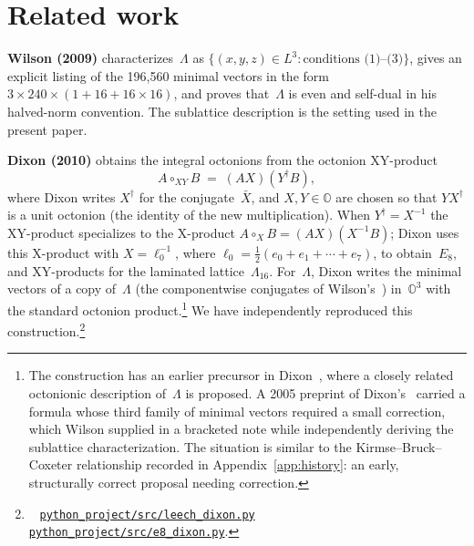 \documentclass[twoside,english]{paper}
\numberwithin{equation}{section}
\numberwithin{figure}{section}
\theoremstyle{definition}
\theoremstyle{remark}
\newcommand{\OO}{\mathbb{O}}          %
\newcommand{\LL}{\Lambda}             %
\newcommand{\scriptref}[1]{\cite{repo}~%
  \href{https://github.com/koeplinger/leech\_alg/blob/main/python\_project/src/#1}%
  {\nolinkurl{python_project/src/#1}}}
\begin{document}
\section{Related work}\label{sec:related}

\textbf{Wilson (2009)} \cite{Wilson2009} characterizes~$\LL$ as
$\{(x,y,z) \in L^3 : \text{conditions (1)--(3)}\}$, gives an explicit
listing of the 196{,}560 minimal vectors in the form
$3 \times 240 \times (1 + 16 + 16 \times 16)$, and proves that~$\LL$
is even and self-dual in his halved-norm convention.  The sublattice description is
the setting used in the present paper.

\textbf{Dixon (2010)} \cite{Dixon2010} obtains the integral octonions
from the octonion XY-product
\begin{equation}\label{eq:disp10}
  A \circ_{XY} B \;=\; (A X)(Y^{\dagger} B),
\end{equation}
where Dixon writes $X^{\dagger}$ for the conjugate~$\bar X$, and
$X, Y \in \OO$ are chosen so that $Y X^{\dagger}$ is a unit octonion
(the identity of the new multiplication).  When $Y^{\dagger} = X^{-1}$
the XY-product specializes to the X-product $A \circ_X B = (AX)(X^{-1}
B)$; Dixon uses this X-product with $X = \ell_0^{-1}$, where $\ell_0 =
\frac{1}{2}(e_0 + e_1 + \cdots + e_7)$, to obtain~$E_8$, and XY-products
for the laminated lattice~$\Lambda_{16}$.  For~$\LL$, Dixon writes the
minimal vectors of a copy of~$\LL$ (the componentwise conjugates of
Wilson's~\cite{Wilson2009}) in~$\OO^3$ with the standard octonion
product.\footnote{The construction
has an earlier precursor in Dixon~\cite{Dixon1995}, where a closely
related octonionic description of~$\LL$ is proposed.  A 2005 preprint
of Dixon's~\cite{Dixon2005} carried a formula whose third family of
minimal vectors required a small correction, which Wilson
\cite{Wilson2009} supplied in a bracketed note while independently
deriving the sublattice characterization.  The situation is similar
to the Kirmse--Bruck--Coxeter relationship recorded in
Appendix~\ref{app:history}: an early, structurally correct proposal
needing correction.}  We have independently reproduced this
construction.\footnote{\scriptref{leech\_dixon.py}
\scriptref{e8\_dixon.py}.}
\end{document}

